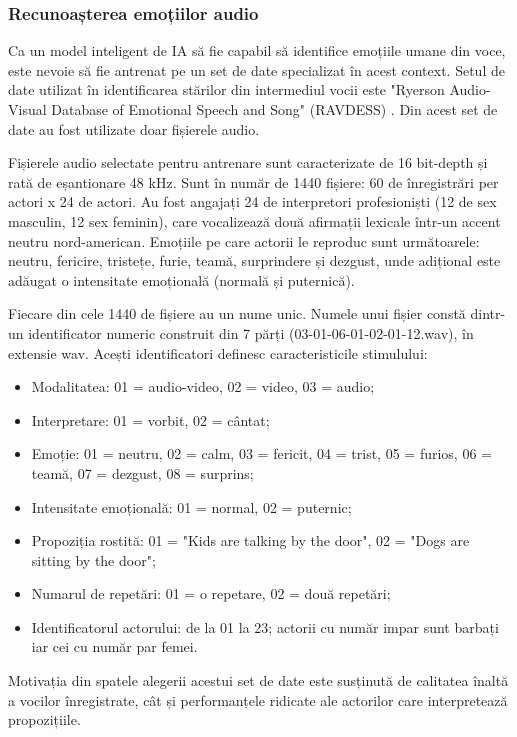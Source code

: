 \documentclass[a4paper, 12pt]{report}
\begin{document}
	\subsubsection{Recunoașterea emoțiilor audio}
	Ca un model inteligent de IA să fie capabil să identifice emoțiile umane din voce, este nevoie să fie antrenat pe un set de date specializat în acest context. Setul de date utilizat în identificarea stărilor din intermediul vocii este "Ryerson Audio-Visual Database of Emotional Speech and Song" (RAVDESS) \cite{ravdess}. Din acest set de date au fost utilizate doar fișierele audio.

	Fișierele audio selectate pentru antrenare sunt caracterizate de 16 bit-depth și rată de eșantionare 48 kHz. Sunt în număr de 1440 fișiere: 60 de înregistrări per actori x 24 de actori. Au fost angajați 24 de interpretori profesioniști (12 de sex masculin, 12 sex feminin), care vocalizează două afirmații lexicale într-un accent neutru nord-american. Emoțiile pe care actorii le reproduc sunt următoarele: neutru, fericire, tristețe, furie, teamă, surprindere și dezgust, unde adițional este adăugat o intensitate emoțională (normală și puternică).

	Fiecare din cele 1440 de fișiere au un nume unic. Numele unui fișier constă dintr-un identificator numeric construit din 7 părți (03-01-06-01-02-01-12.wav), în extensie wav. Acești identificatori definesc caracteristicile stimulului:
	
	\begin{itemize}
		\item Modalitatea: 01 = audio-video, 02 = video, 03 = audio;
		\item Interpretare: 01 = vorbit, 02 = cântat;
		\item Emoție: 01 = neutru, 02 = calm, 03 = fericit, 04 = trist, 05 = furios, 06 = teamă, 07 = dezgust, 08 = surprins;
		\item Intensitate emoțională: 01 = normal, 02 = puternic;
		\item Propoziția rostită: 01 = "Kids are talking by the door", 02 = "Dogs are sitting by the door";
		\item Numarul de repetări: 01 = o repetare, 02 = două repetări;
		\item Identificatorul actorului: de la 01 la 23; actorii cu număr impar sunt barbați iar cei cu număr par femei.
	\end{itemize}

	Motivația din spatele alegerii acestui set de date este susținută de calitatea înaltă a vocilor înregistrate, cât și performanțele ridicate ale actorilor care interpretează propozițiile.
	
\end{document}
